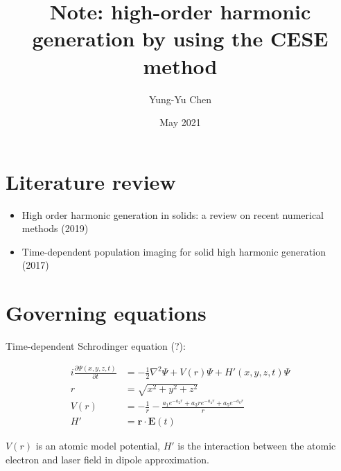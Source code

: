 \documentclass{article}
\title{Note: high-order harmonic generation by using the CESE method}
\author{Yung-Yu Chen}
\date{May 2021}
\begin{document}
\maketitle

\section{Literature review}

\begin{itemize}
    \item High order harmonic generation in solids: a review on recent numerical methods (2019) \cite{yu_high_2019}
    \item Time-dependent population imaging for solid high harmonic generation (2017) \cite{liu_time-dependent_2017}
\end{itemize}

\section{Governing equations}

Time-dependent Schrodinger equation (?):

\begin{align}
i\frac{\partial \Psi(x, y, z, t)}{\partial t} &= -\frac{1}{2}\nabla^2\Psi + V(r)\Psi + H'(x, y, z, t)\Psi \\
r &= \sqrt{x^2 + y^2 + z^2} \\
V(r) &= -\frac{1}{r} - \frac{a_1e^{-a_2r} + a_3 re^{-a_4r} + a_5 e^{-a_6r}}{r} \\
H' &= \mathbf{r} \cdot \mathbf{E}(t)
\end{align}

$V(r)$ is an atomic model potential, $H'$ is the interaction between the
atomic electron and laser field in dipole approximation.



\end{document}

